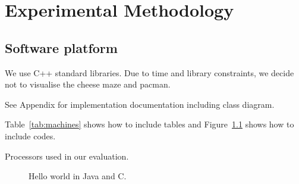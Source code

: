 \chapter{Experimental Methodology}
\label{cha:methodology}

\section{Software platform}
\label{sec:softplat}
We use C++ standard libraries. Due to time and library constraints, we decide not to visualise the cheese maze and pacman. 

See Appendix for implementation documentation including class diagram.


Table~\ref{tab:machines} shows how to include tables and Figure~\ref{fig:helloworld} shows how to include codes.
\begin{table*}
  \centering
  
  \caption{Processors used in our evaluation.}
  \label{tab:machines}
\end{table*}



\begin{figure}
  \centering
  \subfigure[\label{fig:c:hello}]{
  \begin{minipage}[b]{\columnwidth}
    \vspace*{-2ex}
  \end{minipage}}
  \subfigure[\label{fig:java:hello}]{
  \begin{minipage}[b]{\columnwidth}
    \vspace*{-2ex}
  \end{minipage}}
  \caption{Hello world in Java and C.}
  \label{fig:helloworld}
\end{figure}




